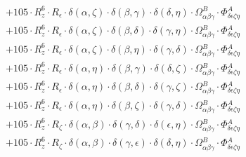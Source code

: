 \documentclass{article}
\begin{document}
\begin{equation}
\begin{array}{c}
 \\[0.2em] 		 + 105 \cdot R_{z}^{6} \cdot R_{\epsilon{}} \cdot \delta{}\left(\alpha{}, \zeta{}\right) \cdot \delta{}\left(\beta{}, \gamma{}\right) \cdot \delta{}\left(\delta{}, \eta{}\right) \cdot \Omega{}^{B}_{\alpha{}\beta{}\gamma{}} \cdot \Phi{}^{A}_{\delta{}\epsilon{}\zeta{}\eta{}} 
 \\[0.2em] 		 + 105 \cdot R_{z}^{6} \cdot R_{\epsilon{}} \cdot \delta{}\left(\alpha{}, \zeta{}\right) \cdot \delta{}\left(\beta{}, \delta{}\right) \cdot \delta{}\left(\gamma{}, \eta{}\right) \cdot \Omega{}^{B}_{\alpha{}\beta{}\gamma{}} \cdot \Phi{}^{A}_{\delta{}\epsilon{}\zeta{}\eta{}} 
 \\[0.2em] 		 + 105 \cdot R_{z}^{6} \cdot R_{\epsilon{}} \cdot \delta{}\left(\alpha{}, \zeta{}\right) \cdot \delta{}\left(\beta{}, \eta{}\right) \cdot \delta{}\left(\gamma{}, \delta{}\right) \cdot \Omega{}^{B}_{\alpha{}\beta{}\gamma{}} \cdot \Phi{}^{A}_{\delta{}\epsilon{}\zeta{}\eta{}} 
 \\[0.2em] 		 + 105 \cdot R_{z}^{6} \cdot R_{\epsilon{}} \cdot \delta{}\left(\alpha{}, \eta{}\right) \cdot \delta{}\left(\beta{}, \gamma{}\right) \cdot \delta{}\left(\delta{}, \zeta{}\right) \cdot \Omega{}^{B}_{\alpha{}\beta{}\gamma{}} \cdot \Phi{}^{A}_{\delta{}\epsilon{}\zeta{}\eta{}} 
 \\[0.2em] 		 + 105 \cdot R_{z}^{6} \cdot R_{\epsilon{}} \cdot \delta{}\left(\alpha{}, \eta{}\right) \cdot \delta{}\left(\beta{}, \delta{}\right) \cdot \delta{}\left(\gamma{}, \zeta{}\right) \cdot \Omega{}^{B}_{\alpha{}\beta{}\gamma{}} \cdot \Phi{}^{A}_{\delta{}\epsilon{}\zeta{}\eta{}} 
 \\[0.2em] 		 + 105 \cdot R_{z}^{6} \cdot R_{\epsilon{}} \cdot \delta{}\left(\alpha{}, \eta{}\right) \cdot \delta{}\left(\beta{}, \zeta{}\right) \cdot \delta{}\left(\gamma{}, \delta{}\right) \cdot \Omega{}^{B}_{\alpha{}\beta{}\gamma{}} \cdot \Phi{}^{A}_{\delta{}\epsilon{}\zeta{}\eta{}} 
 \\[0.2em] 		 + 105 \cdot R_{z}^{6} \cdot R_{\zeta{}} \cdot \delta{}\left(\alpha{}, \beta{}\right) \cdot \delta{}\left(\gamma{}, \delta{}\right) \cdot \delta{}\left(\epsilon{}, \eta{}\right) \cdot \Omega{}^{B}_{\alpha{}\beta{}\gamma{}} \cdot \Phi{}^{A}_{\delta{}\epsilon{}\zeta{}\eta{}} 
 \\[0.2em] 		 + 105 \cdot R_{z}^{6} \cdot R_{\zeta{}} \cdot \delta{}\left(\alpha{}, \beta{}\right) \cdot \delta{}\left(\gamma{}, \epsilon{}\right) \cdot \delta{}\left(\delta{}, \eta{}\right) \cdot \Omega{}^{B}_{\alpha{}\beta{}\gamma{}} \cdot \Phi{}^{A}_{\delta{}\epsilon{}\zeta{}\eta{}} 

\end{array}
\end{equation}
\end{document}

